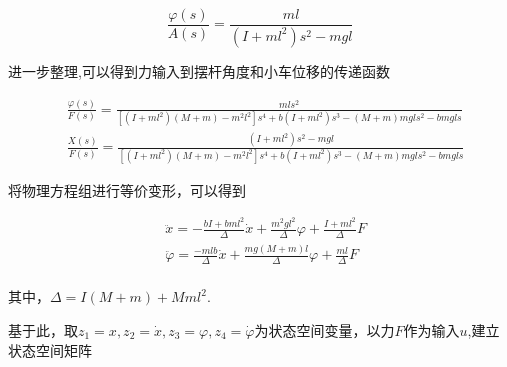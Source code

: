 \documentclass{MathorCupmodeling}
\begin{document}
\begin{equation}
\frac{\varphi(s)}{A(s)}=\frac{ml}{(I+ml^2)s^2-mgl}
\end{equation}

进一步整理,可以得到力输入到摆杆角度和小车位移的传递函数

\begin{equation}
\begin{aligned}
&\frac{\varphi(s)}{F(s)}=\frac{mls^2}{[(I+ml^2)(M+m)-m^2l^2]s^4+b(I+ml^2)s^3-(M+m)mgls^2-bmgls}\\
&\frac{X(s)}{F(s)}=\frac{(I+ml^2)s^2-mgl}{[(I+ml^2)(M+m)-m^2l^2]s^4+b(I+ml^2)s^3-(M+m)mgls^2-bmgls}
\end{aligned}
\end{equation}

将物理方程组进行等价变形，可以得到

\begin{equation}
\begin{aligned}
&\ddot x=-\frac{bI+bml^2}{\Delta}\dot x+\frac{m^2gl^2}{\Delta}\varphi+\frac{I+ml^2}{\Delta}F\\
&\ddot{\varphi}=\frac{-mlb}{\Delta}\dot x+\frac{mg(M+m)l}{\Delta}\varphi+\frac{ml}{\Delta}F\\
\end{aligned}
\end{equation}

其中，$\Delta=I(M+m)+Mml^2$.

基于此，取$z_1=x,z_2=\dot x,z_3=\varphi,z_4=\dot{\varphi}$为状态空间变量，以力$F$作为输入$u$,建立状态空间矩阵
\end{document}
